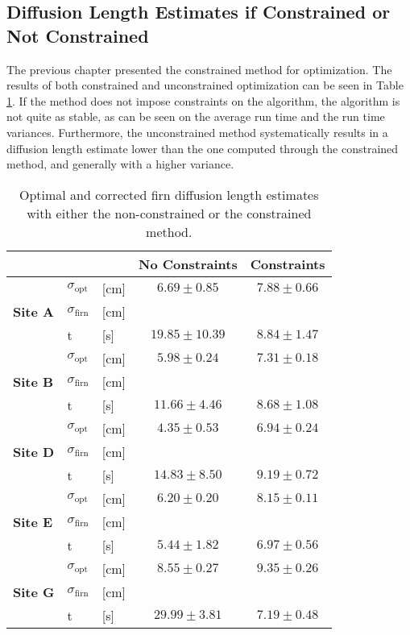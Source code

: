 \documentclass[../../CompleteThesis2/Complete_2ndDraft]{subfiles}
\begin{document}
\subsection[$\sigma$ Constraints or No constraints]{Diffusion Length Estimates if Constrained or Not Constrained}
\label{Subsec:Results_DiffLenEst_AlphabetCores_ConstraintsVNoConstraints}
The previous chapter presented the constrained method for optimization. The results of both constrained and unconstrained optimization can be seen in Table \ref{Tab:diffLens_ConstVNoConst}. If the method does not impose constraints on the algorithm, the algorithm is not quite as stable, as can be seen on the average run time and the run time variances. Furthermore, the unconstrained method systematically results in a diffusion length estimate lower than the one computed through the constrained method, and generally with a higher variance. 
\begin{table}[ht]
	\centering
	\begin{tabular}{l l l | c | c}
		& & & No Constraints & Constraints\\
		\hline
		\hline 
		\multirow{3}{*}{\textbf{Site A}} & $\sigma_{\text{opt}}$ & [cm] & $6.69 \pm 0.85$ & $7.88 \pm 0.66$\\
		& $\sigma_{\text{firn}}$ & [cm] & & \\
		& t & [s] & $19.85\pm 10.39$ & $8.84\pm 1.47$ \\
		\hline
		
		\multirow{3}{*}{\textbf{Site B}} & $\sigma_{\text{opt}}$ & [cm] & $5.98 \pm 0.24$ & $7.31 \pm 0.18$ \\
		& $\sigma_{\text{firn}}$ & [cm] & & \\
		& t & [s] & $11.66 \pm 4.46$ & $8.68 \pm 1.08$\\
		\hline
		
		\multirow{3}{*}{\textbf{Site D}} & $\sigma_{\text{opt}}$ & [cm] & $4.35 \pm 0.53$ & $6.94 \pm 0.24$ \\
		& $\sigma_{\text{firn}}$ & [cm] & & \\
		& t & [s] & $14.83\pm 8.50$& $9.19 \pm 0.72$\\
		\hline
		
		\multirow{3}{*}{\textbf{Site E}} & $\sigma_{\text{opt}}$ & [cm] & $6.20 \pm 0.20$ & $8.15 \pm 0.11$ \\
		& $\sigma_{\text{firn}}$ & [cm] & & \\
		& t & [s] & $5.44 \pm 1.82$ & $6.97 \pm 0.56$\\
		\hline
		
		\multirow{3}{*}{\textbf{Site G}} & $\sigma_{\text{opt}}$ & [cm] & $8.55 \pm 0.27$ & $9.35 \pm 0.26$ \\
		& $\sigma_{\text{firn}}$ & [cm] & & \\
		& t & [s] & $29.99 \pm 3.81$ & $7.19 \pm 0.48$\\
		
		\hline
	\end{tabular}
	\caption[$\sigma$ Estimates Given Unconstrained and Constrained Method]{\small Optimal and corrected firn diffusion length estimates with either the non-constrained or the constrained method.}
	\label{Tab:diffLens_ConstVNoConst}
\end{table}
\end{document}
